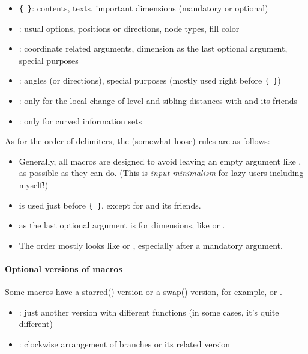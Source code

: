 \begin{itemize}\tightlist
\item \verb+{ }+: contents, texts, important dimensions (mandatory or optional)
\item \xw{[ ]}: usual options, positions or directions, node types, fill color
\item \xw{( )}: coordinate related arguments, dimension as the last optional argument, special purposes
\item \xw{< >}: angles (or directions), special purposes (mostly used right before \verb+{ }+)
\item {}: only for the local change of level and sibling distances with \cmd{\istroot} and its friends
\item \xw{! !}:  only for curved information sets
\end{itemize}

As for the order of delimiters, the (somewhat loose) rules are as follows:

\begin{itemize}\tightlist
\item Generally, all macros are designed to avoid leaving an empty argument like \xw{[][blue]}, as possible as they can do. (This is \emph{input minimalism} for lazy users including myself!)
\item \xw{< >} is used just before \verb+{ }+, except for \xw{\istb} and its friends.
\item \xw{( )} as the last optional argument is for dimensions, like \xw{(1em)} or \xw{(3pt)}.
\item The order mostly looks like \xw{<>\{\}[]} or \xw{<>\{\}[]()}, especially after a mandatory argument.
\end{itemize}

\paragraph{Optional versions of macros}

Some macros have a starred(\xw{*}) version or a swap() version, for example, \cmd{\istb*} or .

\begin{itemize}\tightlist
\item {}: just another version with different functions (in some cases, it's quite different)
\item {}: clockwise arrangement of branches or its related version
\end{itemize}


